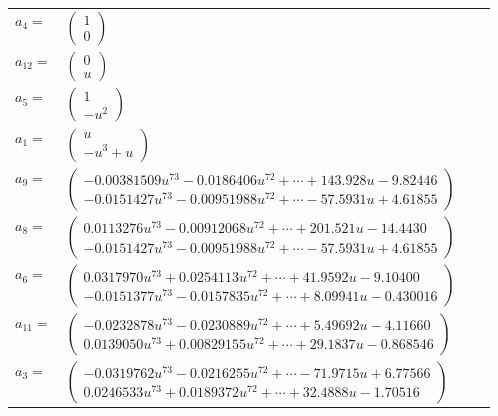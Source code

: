 \documentclass[1p]{elsarticle_modified}
\theoremstyle{definition}
\begin{document}
\begin{tabular}{m{7pt} m{180pt} m{7pt} m{180pt} }
\flushright $a_{4}=$&$\begin{pmatrix}1\\0\end{pmatrix}$ \\
\flushright $a_{12}=$&$\begin{pmatrix}0\\u\end{pmatrix}$ \\
\flushright $a_{5}=$&$\begin{pmatrix}1\\- u^2\end{pmatrix}$ \\
\flushright $a_{1}=$&$\begin{pmatrix}u\\- u^3+u\end{pmatrix}$ \\
\flushright $a_{9}=$&$\begin{pmatrix}-0.00381509 u^{73}-0.0186406 u^{72}+\cdots+143.928 u-9.82446\\-0.0151427 u^{73}-0.00951988 u^{72}+\cdots-57.5931 u+4.61855\end{pmatrix}$ \\
\flushright $a_{8}=$&$\begin{pmatrix}0.0113276 u^{73}-0.00912068 u^{72}+\cdots+201.521 u-14.4430\\-0.0151427 u^{73}-0.00951988 u^{72}+\cdots-57.5931 u+4.61855\end{pmatrix}$ \\
\flushright $a_{6}=$&$\begin{pmatrix}0.0317970 u^{73}+0.0254113 u^{72}+\cdots+41.9592 u-9.10400\\-0.0151377 u^{73}-0.0157835 u^{72}+\cdots+8.09941 u-0.430016\end{pmatrix}$ \\
\flushright $a_{11}=$&$\begin{pmatrix}-0.0232878 u^{73}-0.0230889 u^{72}+\cdots+5.49692 u-4.11660\\0.0139050 u^{73}+0.00829155 u^{72}+\cdots+29.1837 u-0.868546\end{pmatrix}$ \\
\flushright $a_{3}=$&$\begin{pmatrix}-0.0319762 u^{73}-0.0216255 u^{72}+\cdots-71.9715 u+6.77566\\0.0246533 u^{73}+0.0189372 u^{72}+\cdots+32.4888 u-1.70516\end{pmatrix}$ \\

\end{tabular}
\end{document}
